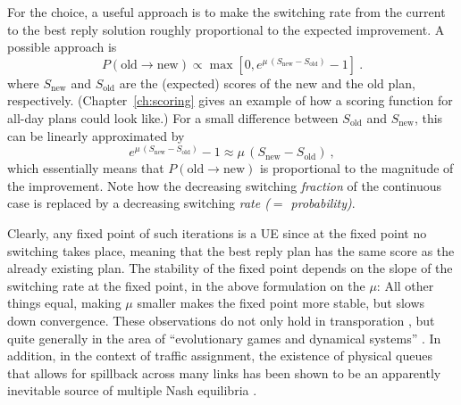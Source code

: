 For the choice, a useful approach is to make the switching rate from
the current to the best reply solution roughly proportional to the
expected improvement. A possible approach is
\begin{equation}
P(\text{old} \to \text{new}) \propto \max[ 0, e^{\mu \, (S_{\text{new}} - S_{\text{old}})} - 1]\ .
\end{equation}
where $S_\text{new}$ and $S_\text{old}$ are the (expected) scores of the new
and the old plan, respectively. 
 
(Chapter~\ref{ch:scoring} %
gives an example of how a scoring function for all-day plans could
look like.)  For a small difference between $S_\text{old}$ and $S_\text{new}$,
this can be linearly approximated by
\begin{equation}
e^{\mu \, (S_\text{new} - S_\text{old})} - 1
\approx\mu \,  (S_\text{new} - S_\text{old})\ ,
\label{eq:10}
\end{equation}
which essentially means that $P(\text{old} \to \text{new})$ is proportional to the 
magnitude of the improvement.  Note how
the decreasing switching \emph{fraction} of the continuous case is
replaced by a decreasing switching \emph{rate ($=$ probability)}.

Clearly, any fixed point of such iterations is a UE since at the
fixed point no switching takes place, meaning that the best reply plan
has the same score as the already existing plan.  
%
The stability of the fixed point depends on the slope of the switching
rate at the fixed point, in the above formulation on the $\mu$: All
other things equal, making $\mu$ smaller makes the fixed point more
stable, but slows down convergence. 
%
These observations do not only hold in transporation \citep[e.g.,][]{watling-2003},
but quite generally in the area of ``evolutionary
games and dynamical systems'' \citep{HofbSigmBook}. 
%
In addition, in the context of
traffic assignment, the existence of physical queues that allows for 
spillback across many links has been shown to be an apparently inevitable
source of multiple Nash equilibria \citep[][]{daganzo-1998}.

